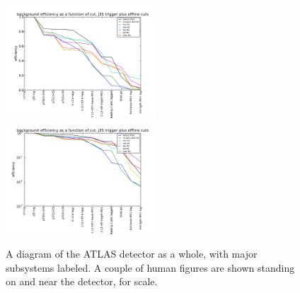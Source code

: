 \begin{figure}
	\includegraphics[width=0.5\textwidth]{TriggerCuts/cut_efficiencies_j35_background.pdf}	
	\includegraphics[width=0.5\textwidth]{TriggerCuts/cut_efficiencies_logy_j35_background.pdf}	
    \caption{A diagram of the ATLAS detector as a whole, with major subsystems labeled.  A couple of human figures are shown standing on and near the detector, for scale. \label{fig:background_eff_cutflow}}
\end{figure}









